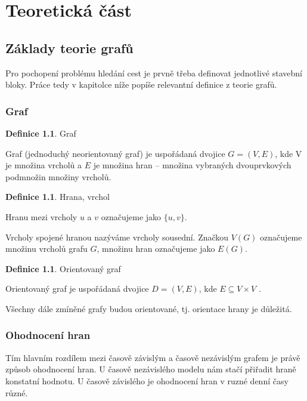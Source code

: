 \documentclass[thesis=M,czech]{FITthesis}[2019/12/23]
\theoremstyle{plain}
\theoremstyle{definition}
\newtheorem{defn}[thm]{Definice} %
\begin{document}
\chapter{Teoretická část}
\section{Základy teorie grafů}

Pro pochopení problému hledání cest je prvně třeba definovat jednotlivé stavební bloky. Práce tedy v kapitolce níže popíše relevantní definice z teorie grafů.

\subsection{Graf}

\begin{defn}{Graf}\label{thm:graf}
	
	
	Graf (jednoduchý neorientovaný graf) je uspořádaná dvojice $G = (V,E)$, kde V je množina vrcholů a $E$ je množina hran – množina vybraných dvouprvkových podmnožin množiny vrcholů. \cite{zaklady-teorie-grafu}
	\end{defn}

\begin{defn}{Hrana, vrchol}\label{thm:graf}

Hranu mezi vrcholy $u$ a $v$ označujeme jako $\{u, v\}$. 

Vrcholy spojené hranou nazýváme vrcholy sousední. Značkou $V(G)$ označujeme množinu vrcholů grafu $G$, množinu hran označujeme jako $E(G)$.
\end{defn}

\begin{defn}{Orientovaný graf}\label{thm:graf}

Orientovaný graf je uspořádaná dvojice $D = (V, E)$, kde $E \subseteq V \times V$ . 
\end{defn}

Všechny dále zmíněné grafy budou orientované, tj. orientace hrany je důležitá.


\subsection{Ohodnocení hran}

Tím hlavním rozdílem mezi časově závislým a časově nezávislým grafem je právě způsob ohodnocení hran. U časově nezávislého modelu nám stačí přiřadit hraně konstatní hodnotu. U časově závislého je ohodnocení hran v ruzné denní časy různé.
\end{document}
